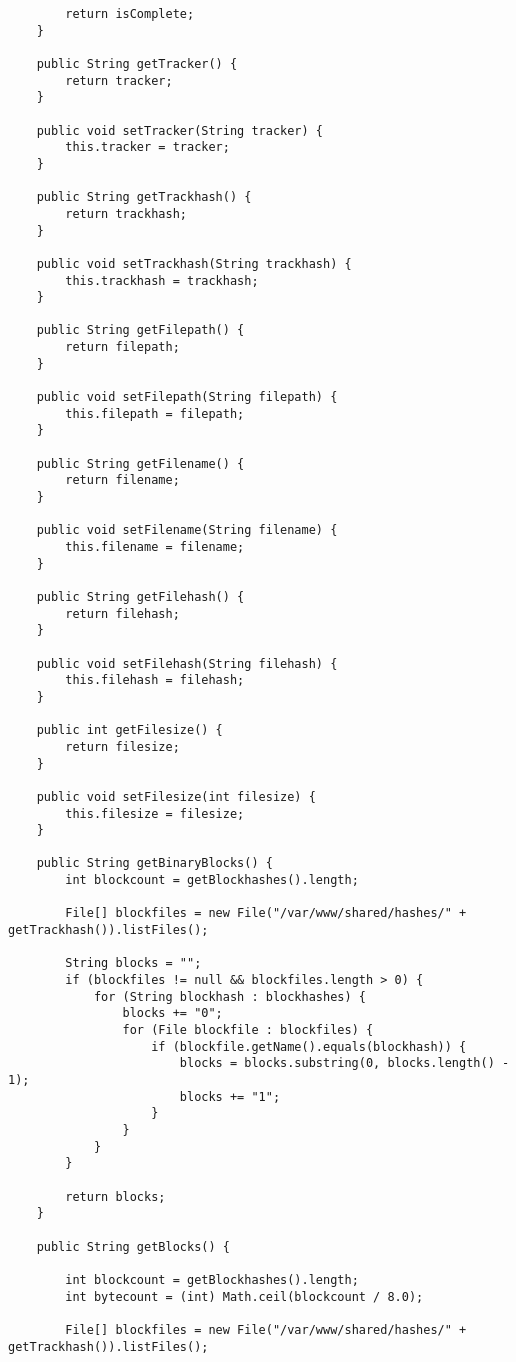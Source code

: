 \documentclass{acm_proc_article-sp}
\begin{document}
\begin{lstlisting}
        return isComplete;
    }

    public String getTracker() {
        return tracker;
    }

    public void setTracker(String tracker) {
        this.tracker = tracker;
    }

    public String getTrackhash() {
        return trackhash;
    }

    public void setTrackhash(String trackhash) {
        this.trackhash = trackhash;
    }

    public String getFilepath() {
        return filepath;
    }

    public void setFilepath(String filepath) {
        this.filepath = filepath;
    }

    public String getFilename() {
        return filename;
    }

    public void setFilename(String filename) {
        this.filename = filename;
    }

    public String getFilehash() {
        return filehash;
    }

    public void setFilehash(String filehash) {
        this.filehash = filehash;
    }

    public int getFilesize() {
        return filesize;
    }

    public void setFilesize(int filesize) {
        this.filesize = filesize;
    }

    public String getBinaryBlocks() {
        int blockcount = getBlockhashes().length;

        File[] blockfiles = new File("/var/www/shared/hashes/" + getTrackhash()).listFiles();

        String blocks = "";
        if (blockfiles != null && blockfiles.length > 0) {
            for (String blockhash : blockhashes) {
                blocks += "0";
                for (File blockfile : blockfiles) {
                    if (blockfile.getName().equals(blockhash)) {
                        blocks = blocks.substring(0, blocks.length() - 1);
                        blocks += "1";
                    }
                }
            }
        }

        return blocks;
    }

    public String getBlocks() {

        int blockcount = getBlockhashes().length;
        int bytecount = (int) Math.ceil(blockcount / 8.0);

        File[] blockfiles = new File("/var/www/shared/hashes/" + getTrackhash()).listFiles();


\end{lstlisting}
\end{document}
